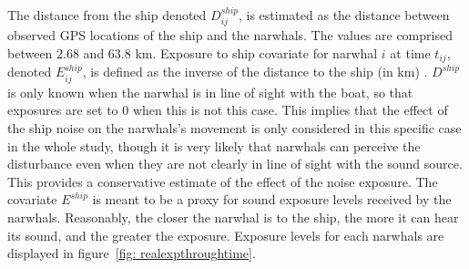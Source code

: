 \documentclass[11pt]{article}
\newcommand {\1}{\mathbb{1}}
\theoremstyle{definition}
\theoremstyle{remark}
\theoremstyle{remark}
\begin{document}

The distance from the ship denoted $D^{ship}_{ij}$, is estimated as the distance between observed GPS locations of the ship and the narwhals. The values are comprised between $2.68$ and $63.8$ km.
Exposure to ship covariate for narwhal $i$ at time $t_{ij}$, denoted $E^{ship}_{ij}$, is defined as the inverse of the distance to the ship (in km) \cite{heide-jorgensen_behavioral_2021}.
$D^{ship}$ is only known when the narwhal is in line of sight with the boat, so that exposures are set to $0$ when this is not this case. This implies that the effect of the ship noise on the narwhals's movement is only considered in this specific case in the whole study, though it is very likely that narwhals can perceive the disturbance even when they are not clearly in line of sight with the sound source. This provides a conservative estimate of the effect of the noise exposure. The covariate $E^{ship}$ is meant to be a proxy for sound exposure levels received by the narwhals. Reasonably, the closer the narwhal is to the ship, the more it can hear its sound, and the greater the exposure. Exposure levels for each narwhals are displayed in figure~\ref{fig: realexpthroughtime}.
\end{document}
